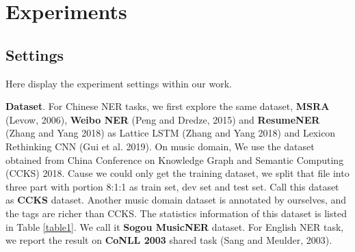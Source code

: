 \documentclass[letterpaper]{article} %
\begin{document}
\begin{table}[t]
\caption{Main Results on CoNLL 2003.}\smallskip
\centering
{}
\label{table_conll}
\end{table}

\section{Experiments}

\subsection{Settings}

Here display the experiment settings within our work.

\textbf{Dataset}. For Chinese NER tasks, we first explore the same dataset, \textbf{MSRA} (Levow, 2006), \textbf{Weibo NER} (Peng and Dredze, 2015) and \textbf{ResumeNER} (Zhang and Yang 2018) as Lattice LSTM (Zhang and Yang 2018) and Lexicon Rethinking CNN (Gui et al. 2019). On music domain, We use the dataset obtained from China Conference on Knowledge Graph and Semantic Computing (CCKS) 2018. Cause we could only get the training dataset,  we split that file into three part with portion 8:1:1 as train set, dev set and test set. Call this dataset as \textbf{CCKS} dataset. Another music domain dataset is annotated by ourselves, and the tags are richer than CCKS. The statistics information of this dataset is listed in Table \ref{table1}. We call it \textbf{Sogou MusicNER} dataset. For English NER task, we report the result on \textbf{CoNLL 2003} shared task (Sang and Meulder, 2003).
\end{document}
